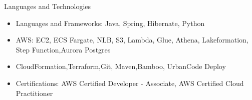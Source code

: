 \documentclass[]{mcdowellcv}
\begin{document}
    \makeheader

    \begin{cvsection}{Languages and Technologies}
        \begin{cvsubsection}{}{}{}
            \begin{itemize}
                \item Languages and Frameworks: Java, Spring, Hibernate, Python
                \item AWS: EC2, ECS Fargate, NLB, S3, Lambda, Glue, Athena, Lakeformation, Step Function,Aurora Postgres
                \item CloudFormation,Terraform,Git, Maven,Bamboo, UrbanCode Deploy
                \item Certifications: AWS Certified Developer - Associate, AWS Certified Cloud Practitioner
            \end{itemize}
        \end{cvsubsection}
    \end{cvsection}
\end{document}
